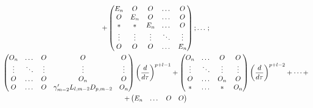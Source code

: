 \begin{pf}
\begin{gather}
%


+


\begin{pmatrix}


E_n & O & O & \dotsc & O\\


O & E_n & O & \dotsc & O\\


\ast & * & E_n & \dotsc & O\\


\vdots & \vdots & \vdots & \ddots & \vdots\\


O & O & O & \dotsc & E_n


\end{pmatrix};\dotsc; \\


%


\begin{pmatrix}


O_n & \dotsc & O & O & O\\


\vdots & \ddots & \vdots & \vdots & \vdots\\


O & \dotsc & O & O_n & O\\


O & \dotsc & O & \gamma_{m-2}'L_{l,m-2}D_{p,m-2} & O_n


\end{pmatrix} 


\bigg(\frac{d}{d\tau}\bigg)^{p+l-1}+


\begin{pmatrix}


O_n & \dotsc & O & O\\


\vdots & \ddots & \vdots & \vdots\\


O & \dotsc & O_n & O\\


\ast & \dotsc & * & O_n


\end{pmatrix}


\bigg(\frac{d}{d\tau}\bigg)^{p+l-2}+\dotsb+ \notag \\


%


+


\begin{pmatrix}


E_n & \dotsc & O & O\\



\end{pmatrix}
\end{gather}
\end{pf}
